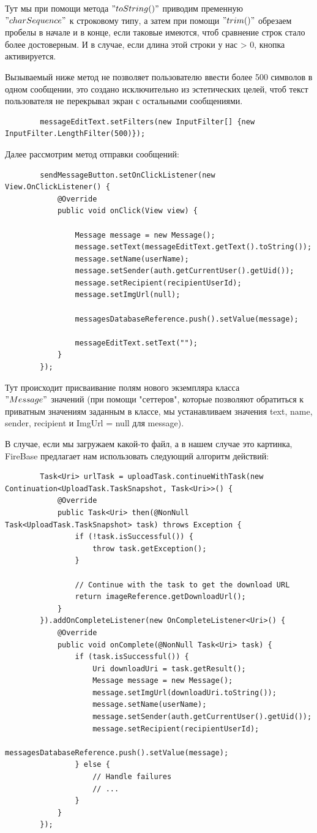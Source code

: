 \documentclass[utf8,14pt,a4paper,oneside,russian]{book}
\begin{document}
	Тут мы при помощи метода $"toString()"$ приводим пременную\\ $"charSequence"$ к строковому типу, а затем при помощи $"trim()"$ обрезаем пробелы в начале и в конце, если таковые имеются, чтоб сравнение строк стало более достоверным. И в случае, если длина этой строки у нас > 0, кнопка активируется.
	
	Вызываемый ниже метод не позволяет пользователю ввести более 500 символов в одном сообщении, это создано исключительно из эстетических целей, чтоб текст пользователя не перекрывал экран с остальными сообщениями.
	
	\begin{lstlisting}
		messageEditText.setFilters(new InputFilter[] {new InputFilter.LengthFilter(500)});
	\end{lstlisting}
	
	Далее рассмотрим метод отправки сообщений:
	
	\begin{lstlisting}
		sendMessageButton.setOnClickListener(new View.OnClickListener() {
			@Override
			public void onClick(View view) {
				
				Message message = new Message();
				message.setText(messageEditText.getText().toString());
				message.setName(userName);
				message.setSender(auth.getCurrentUser().getUid());
				message.setRecipient(recipientUserId);
				message.setImgUrl(null);
				
				messagesDatabaseReference.push().setValue(message);
				
				messageEditText.setText("");
			}
		});
	\end{lstlisting}

	Тут происходит присваивание полям нового экземпляра класса \\$"Message"$ значений (при помощи "сеттеров", которые позволяют обратиться к приватным значениям заданным в классе, мы устанавливаем значения text, name, sender, recipient и ImgUrl = null для message).
	
	В случае, если мы загружаем какой-то файл, а в нашем случае это картинка, FireBase предлагает нам использовать следующий алгоритм действий:
	
	\begin{lstlisting}
		Task<Uri> urlTask = uploadTask.continueWithTask(new Continuation<UploadTask.TaskSnapshot, Task<Uri>>() {
			@Override
			public Task<Uri> then(@NonNull Task<UploadTask.TaskSnapshot> task) throws Exception {
				if (!task.isSuccessful()) {
					throw task.getException();
				}
				
				// Continue with the task to get the download URL
				return imageReference.getDownloadUrl();
			}
		}).addOnCompleteListener(new OnCompleteListener<Uri>() {
			@Override
			public void onComplete(@NonNull Task<Uri> task) {
				if (task.isSuccessful()) {
					Uri downloadUri = task.getResult();
					Message message = new Message();
					message.setImgUrl(downloadUri.toString());
					message.setName(userName);
					message.setSender(auth.getCurrentUser().getUid());
					message.setRecipient(recipientUserId);
					messagesDatabaseReference.push().setValue(message);
				} else {
					// Handle failures
					// ...
				}
			}
		});
	\end{lstlisting}
\end{document}
